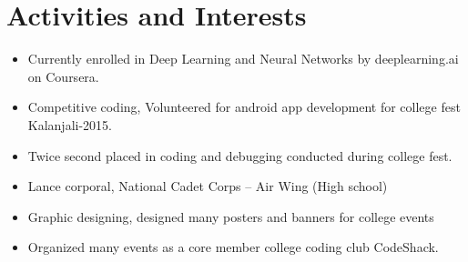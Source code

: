 \documentclass[10pt]{article}
\begin{document}
\section{Activities and Interests}
\begin{itemize}
        \itemsep0em
    \item
        Currently enrolled in Deep Learning and Neural Networks by
        deeplearning.ai on Coursera.
    \item
        Competitive coding, Volunteered for android app development for college fest Kalanjali-2015.
    \item
        Twice second placed in coding and debugging conducted during college fest.
    \item
        Lance corporal, National Cadet Corps – Air Wing (High school)
    \item
        Graphic designing, designed many posters and banners for college events
    \item
         Organized many events as a core member college coding club CodeShack.
\end{itemize}
\end{document}
